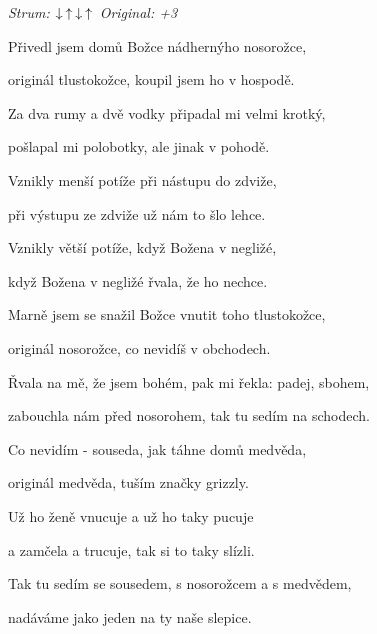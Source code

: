 \begin{song}


 \quad
\textit{Strum:} $\Down\Up\Down\Up$ \quad
\textit{Original: +3}

\Large


\Large

\bigskip

Přivedl jsem domů Božce nádhernýho nosorožce, \par
{}originál tlustokožce, koupil jsem ho v hospodě. \par
{}Za dva rumy a dvě vodky připadal mi velmi krotký, \par
{}pošlapal mi polobotky, ale jinak v pohodě. \par

\bigskip

Vznikly menší potíže při nástupu do zdviže, \par
{}při výstupu ze zdviže už nám to šlo lehce. \par
{}Vznikly větší potíže, když Božena v negližé, \par
{}když Božena v negližé řvala, že ho nechce. \par

\bigskip

Marně jsem se snažil Božce vnutit toho tlustokožce, \par
{}originál nosorožce, co nevidíš v obchodech. \par
{}Řvala na mě, že jsem bohém, pak mi řekla: padej, sbohem, \par
{}zabouchla nám před nosorohem, tak tu sedím na schodech. \par

\bigskip

Co nevidím - souseda, jak táhne domů medvěda, \par
{}originál medvěda, tuším značky grizzly. \par
{}Už ho ženě vnucuje a už ho taky pucuje \par
a zamčela a trucuje, tak si to taky slízli. \par

\bigskip

Tak tu sedím se sousedem, s nosorožcem a s medvědem, \par
{}nadáváme jako jeden na ty naše slepice. \par

\end{song}
